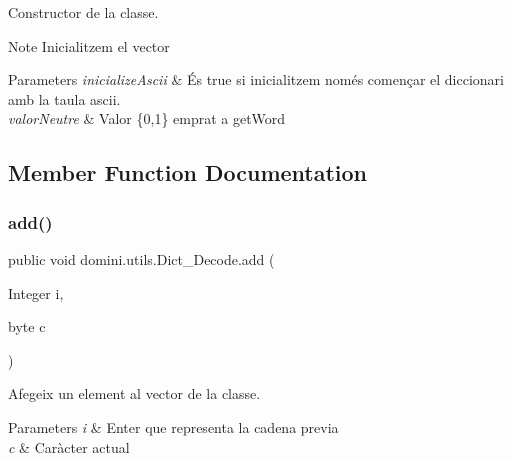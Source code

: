 Constructor de la classe. 

\begin{DoxyNote}{Note}
Inicialitzem el vector 
\end{DoxyNote}

\begin{DoxyParams}{Parameters}
{\em inicialize\+Ascii} & És true si inicialitzem només començar el diccionari amb la taula ascii. \\
\hline
{\em valor\+Neutre} & Valor \{0,1\} emprat a get\+Word \\
\hline
\end{DoxyParams}


\subsection{Member Function Documentation}
\mbox{\label{classdomini_1_1utils_1_1Dict__Decode_a077011e4507db308d143ea9b7146abb9}} 
\subsubsection{\texorpdfstring{add()}{add()}}
{\footnotesize\ttfamily public void domini.\+utils.\+Dict\+\_\+\+Decode.\+add (\begin{DoxyParamCaption}\item[{Integer}]{i,  }\item[{byte}]{c }\end{DoxyParamCaption})\hspace{0.3cm}{\ttfamily [inline]}}



Afegeix un element al vector de la classe. 


\begin{DoxyParams}{Parameters}
{\em i} & Enter que representa la cadena previa \\
\hline
{\em c} & Caràcter actual \\
\hline
\end{DoxyParams}
\mbox{\label{classdomini_1_1utils_1_1Dict__Decode_aac69020c3515649e8c2d70e2908e3f3e}} 
